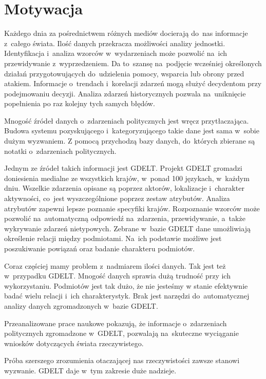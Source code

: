 \documentclass[11pt]{report}
\begin{document}
    \section{Motywacja}\label{sec:motywacja}
    Każdego dnia za pośrednictwem różnych mediów docierają do~nas informacje z~całego świata.
    Ilość danych przekracza możliwości analizy jednostki.
    Identyfikacja i~analiza wzorców w~wydarzeniach może pozwolić na~ich przewidywanie z~wyprzedzeniem.
    Da to~szansę na~podjęcie wcześniej określonych działań przygotowujących do~udzielenia pomocy, wsparcia lub obrony przed atakiem.
    Informacje o~trendach i~korelacji zdarzeń mogą służyć decydentom przy podejmowaniu decyzji.
    Analiza zdarzeń historycznych pozwala na~uniknięcie popełnienia po raz kolejny tych samych błędów.

    Mnogość źródeł danych o~zdarzeniach politycznych jest wręcz przytłaczająca.
    Budowa systemu pozyskującego i~kategoryzującego takie dane jest sama w~sobie dużym wyzwaniem.
    Z pomocą przychodzą bazy danych, do~których zbierane są notatki o~zdarzeniach politycznych.


    Jednym ze źródeł takich informacji jest GDELT\@.
    Projekt GDELT gromadzi doniesienia medialne ze wszystkich krajów, w~ponad 100 językach, w~każdym dniu.
    Wszelkie zdarzenia opisane są poprzez aktorów, lokalizacje i~charakter aktywności, co~jest wyszczególnione poprzez zestaw atrybutów.
    Analiza atrybutów zapewni lepsze poznanie specyfiki krajów.
    Rozpoznanie wzorców może pozwolić na~automatyczną odpowiedź na~zdarzenia, przewidywanie, a~także wykrywanie zdarzeń nietypowych.
    Zebrane w~bazie GDELT dane umożliwiają określenie relacji między podmiotami.
    Na~ich podstawie możliwe jest poszukiwanie powiązań oraz badanie charakteru podmiotów.

    Coraz częściej mamy problem z~nadmiarem ilości danych.
    Tak jest też w~przypadku GDELT\@.
    Mnogość danych sprawia dużą trudność przy ich wykorzystaniu.
    Podmiotów jest tak dużo, że nie jesteśmy w stanie efektywnie badać wielu relacji i~ich charakterystyk.
    Brak jest narzędzi do~automatycznej analizy danych zgromadzonych w~bazie GDELT\@.

    Przeanalizowane prace naukowe pokazują, że informacje o~zdarzeniach politycznych zgromadzone w~GDELT,
    pozwalają na~skuteczne wyciąganie wniosków dotyczących świata rzeczywistego.

    Próba szerszego zrozumienia otaczającej nas rzeczywistości zawsze stanowi wyzwanie.
    GDELT daje w~tym zakresie duże nadzieje.
\end{document}
